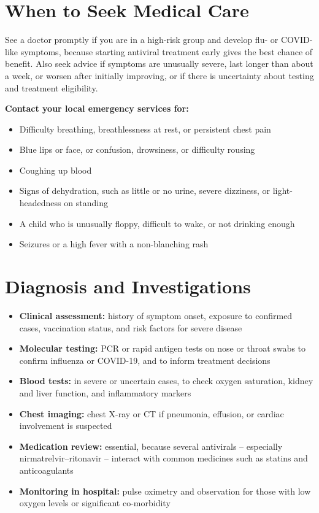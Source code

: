 \section*{When to Seek Medical Care}
See a doctor promptly if you are in a high-risk group and develop flu- or COVID-like symptoms, because starting antiviral treatment early gives the best chance of benefit. Also seek advice if symptoms are unusually severe, last longer than about a week, or worsen after initially improving, or if there is uncertainty about testing and treatment eligibility.

\textbf{Contact your local emergency services for:}
\begin{itemize}
    \item Difficulty breathing, breathlessness at rest, or persistent chest pain
    \item Blue lips or face, or confusion, drowsiness, or difficulty rousing
    \item Coughing up blood
    \item Signs of dehydration, such as little or no urine, severe dizziness, or light-headedness on standing
    \item A child who is unusually floppy, difficult to wake, or not drinking enough
    \item Seizures or a high fever with a non-blanching rash
\end{itemize}

\section*{Diagnosis and Investigations}
\begin{itemize}
    \item \textbf{Clinical assessment:} history of symptom onset, exposure to confirmed cases, vaccination status, and risk factors for severe disease
    \item \textbf{Molecular testing:} PCR or rapid antigen tests on nose or throat swabs to confirm influenza or COVID-19, and to inform treatment decisions
    \item \textbf{Blood tests:} in severe or uncertain cases, to check oxygen saturation, kidney and liver function, and inflammatory markers
    \item \textbf{Chest imaging:} chest X-ray or CT if pneumonia, effusion, or cardiac involvement is suspected
    \item \textbf{Medication review:} essential, because several antivirals -- especially nirmatrelvir--ritonavir -- interact with common medicines such as statins and anticoagulants
    \item \textbf{Monitoring in hospital:} pulse oximetry and observation for those with low oxygen levels or significant co-morbidity
\end{itemize}

